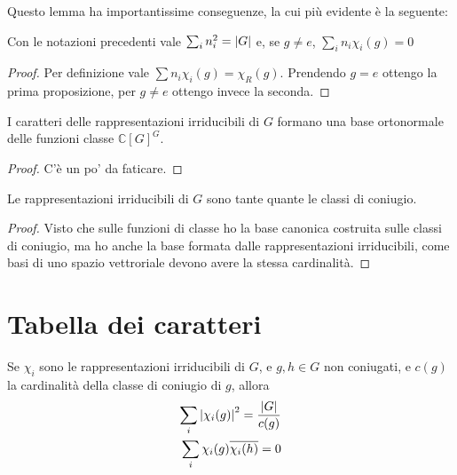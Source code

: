 \documentclass[a4paper,10pt,oneside]{math_article}
\newcommand{\class}[1]{\mathbb C[#1]^#1}
\let\conj\overline
\begin{document}
    Questo lemma ha importantissime conseguenze, la cui più evidente è la seguente:
    \begin{myprop}
     Con le notazioni precedenti vale $\sum_i n_i^2 = \left|G\right|$ e, se $g\ne e$, $\sum_i n_i \chi_i(g)=0$
    \end{myprop}
    \begin{proof}
     Per definizione vale $\sum n_i \chi_i(g) = \chi_R(g)$. Prendendo $g=e$ ottengo la prima proposizione, per $g\ne e$ ottengo invece la seconda.
    \end{proof}

    \begin{mytheorem}
     I caratteri delle rappresentazioni irriducibili di $G$ formano una base ortonormale delle funzioni classe $\class G$.
    \end{mytheorem}
    
    \begin{proof}
     C'è un po' da faticare.
    \end{proof}

    
    \begin{mytheorem}
     Le rappresentazioni irriducibili di $G$ sono tante quante le classi di coniugio.
    \end{mytheorem}

    \begin{proof}
     Visto che sulle funzioni di classe ho la base canonica costruita sulle classi di coniugio, ma ho anche la base formata dalle rappresentazioni irriducibili, come basi di uno spazio vettroriale devono avere la stessa cardinalità.
    \end{proof}

    \section{Tabella dei caratteri}
    
    \begin{myprop}
     Se $\chi_i$ sono le rappresentazioni irriducibili di $G$, e $g,h\in G$ non coniugati, e $c(g)$ la cardinalità della classe di coniugio di $g$, allora 
     \begin{align*}
	\sum_i \abs{\chi_i(g)}^2 = \frac {\abs G}{c(g)}\\
	\sum_i \chi_i(g)\conj{\chi_i(h)} = 0
     \end{align*}
    \end{myprop}



\iffalse 
\end{document}
